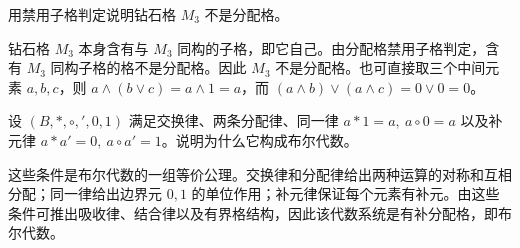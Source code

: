 \begin{exercise}[level=advanced]
用禁用子格判定说明钻石格 $M_3$ 不是分配格。
\begin{solution}
钻石格 $M_3$ 本身含有与 $M_3$ 同构的子格，即它自己。由分配格禁用子格判定，含有 $M_3$ 同构子格的格不是分配格。因此 $M_3$ 不是分配格。也可直接取三个中间元素 $a,b,c$，则 $a\wedge(b\vee c)=a\wedge1=a$，而 $(a\wedge b)\vee(a\wedge c)=0\vee0=0$。
\end{solution}
\end{exercise}

\begin{exercise}[level=advanced]
设 $(B,*,\circ,{}',0,1)$ 满足交换律、两条分配律、同一律 $a*1=a,\ a\circ0=a$ 以及补元律 $a*a'=0,\ a\circ a'=1$。说明为什么它构成布尔代数。
\begin{solution}
这些条件是布尔代数的一组等价公理。交换律和分配律给出两种运算的对称和互相分配；同一律给出边界元 $0,1$ 的单位作用；补元律保证每个元素有补元。由这些条件可推出吸收律、结合律以及有界格结构，因此该代数系统是有补分配格，即布尔代数。
\end{solution}
\end{exercise}

